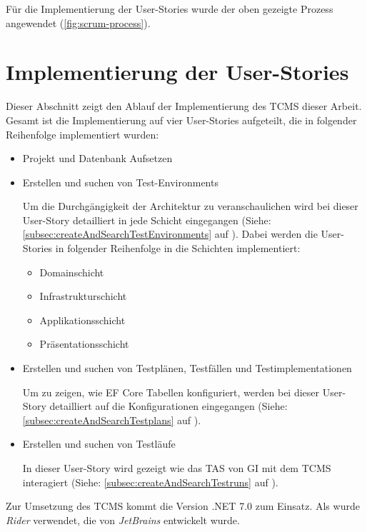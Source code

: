 \documentclass[a4paper, fontsize=11pt, parskip=half, twoside]{scrreprt}
\begin{document}
	Für die Implementierung der User-Stories wurde der oben gezeigte Prozess angewendet (\autoref{fig:scrum-process}).
	
	\section{Implementierung der User-Stories}
	Dieser Abschnitt zeigt den Ablauf der Implementierung des \ac{TCMS} dieser Arbeit.
	Gesamt ist die Implementierung auf vier User-Stories aufgeteilt, die in folgender Reihenfolge implementiert wurden:
	
	\begin{itemize}
		\item Projekt und Datenbank Aufsetzen
		\item Erstellen und suchen von Test-Environments
		
		Um die Durchgängigkeit der Architektur zu veranschaulichen wird bei dieser User-Story detailliert in jede Schicht eingegangen (Siehe: \autoref{subsec:createAndSearchTestEnvironments} auf ).
		Dabei werden die User-Stories in folgender Reihenfolge in die Schichten implementiert:
		
		\begin{itemize}
			\setlength\itemsep{-0.5em}
			\item Domainschicht
			\item Infrastrukturschicht
			\item Applikationsschicht
			\item Präsentationsschicht
		\end{itemize}
	
		\item Erstellen und suchen von Testplänen, Testfällen und Testimplementationen
		
		Um zu zeigen, wie \ac{EF} Core Tabellen konfiguriert, werden bei dieser User-Story detailliert auf die Konfigurationen eingegangen (Siehe: \autoref{subsec:createAndSearchTestplans} auf ).
		
		\item Erstellen und suchen von Testläufe
		
		In dieser User-Story wird gezeigt wie das \ac{TAS} von \ac{GI} mit dem \ac{TCMS} interagiert (Siehe: \autoref{subsec:createAndSearchTestruns} auf ).
	\end{itemize}

	Zur Umsetzung des \ac{TCMS} kommt die Version .NET 7.0 zum Einsatz.
	Als  wurde \emph{Rider} verwendet, die von \emph{JetBrains} entwickelt wurde.
\end{document}
